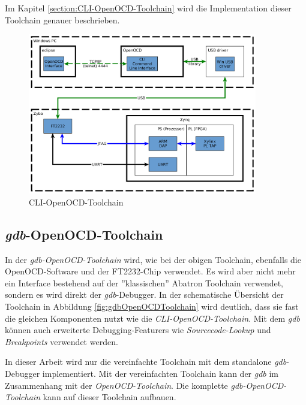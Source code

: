 Im Kapitel \ref{section:CLI-OpenOCD-Toolchain} wird die Implementation dieser Toolchain genauer beschrieben.


\begin{figure}[htbp]
	\centering
		\includegraphics[width=10cm,height=\textheight,keepaspectratio]{graphs/CLIOpenOCDToolchain.png}
	\caption{CLI-OpenOCD-Toolchain}
	\label{fig:CLIOpenOCDToolchain}
\end{figure}


\FloatBarrier
\subsection{\textit{gdb}-OpenOCD-Toolchain}
In der \textit{gdb-OpenOCD-Toolchain} wird, wie bei der obigen Toolchain, ebenfalls die OpenOCD-Software und der FT2232-Chip verwendet.
Es wird aber nicht mehr ein Interface bestehend auf der ''klassischen'' Abatron Toolchain verwendet, sondern es wird direkt der \textit{gdb}-Debugger.
In der schematische Übersicht der Toolchain in Abbildung \ref{fig:gdbOpenOCDToolchain} wird deutlich, dass sie fast die gleichen Komponenten nutzt wie die \textit{CLI-OpenOCD-Toolchain}.
Mit dem \textit{gdb} können auch erweiterte Debugging-Featurers wie \textit{Sourcecode-Lookup} und \textit{Breakpoints} verwendet werden.

In dieser Arbeit wird nur die vereinfachte Toolchain mit dem standalone \textit{gdb}-Debugger implementiert.
Mit der vereinfachten Toolchain kann der \textit{gdb} im Zusammenhang mit der \textit{OpenOCD-Toolchain}.
Die komplette \textit{gdb-OpenOCD-Toolchain} kann auf dieser Toolchain aufbauen.

